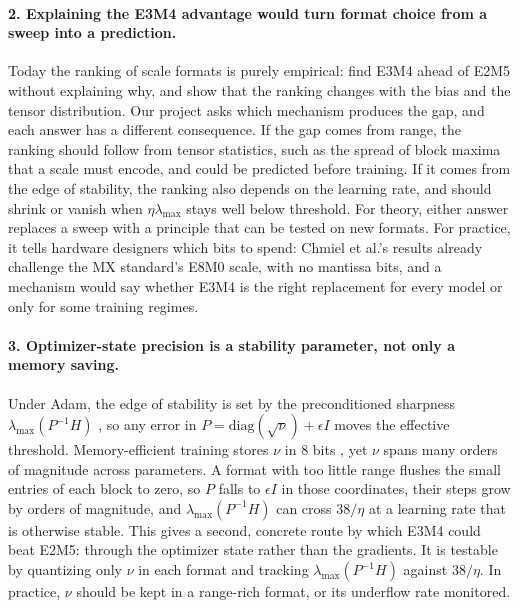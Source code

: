 \documentclass[11pt,letterpaper]{article}
\begin{document}
\paragraph{2. Explaining the E3M4 advantage would turn format choice from a sweep into a prediction.}
Today the ranking of scale formats is purely empirical: \citet{Chmiel2025} find E3M4 ahead of E2M5 without explaining why, and \citet{Kuzmin2022} show that the ranking changes with the bias and the tensor distribution. Our project asks which mechanism produces the gap, and each answer has a different consequence. If the gap comes from range, the ranking should follow from tensor statistics, such as the spread of block maxima that a scale must encode, and could be predicted before training. If it comes from the edge of stability, the ranking also depends on the learning rate, and should shrink or vanish when $\eta\lambda_{\max}$ stays well below threshold. For theory, either answer replaces a sweep with a principle that can be tested on new formats. For practice, it tells hardware designers which bits to spend: Chmiel et al.'s results already challenge the MX standard's E8M0 scale, with no mantissa bits, and a mechanism would say whether E3M4 is the right replacement for every model or only for some training regimes.

\paragraph{3. Optimizer-state precision is a stability parameter, not only a memory saving.}
Under Adam, the edge of stability is set by the preconditioned sharpness $\lambda_{\max}(P^{-1}H)$ \citep{Cohen2022}, so any error in $P=\mathrm{diag}(\sqrt{\nu})+\epsilon I$ moves the effective threshold. Memory-efficient training stores $\nu$ in 8 bits \citep{Dettmers2022b}, yet $\nu$ spans many orders of magnitude across parameters. A format with too little range flushes the small entries of each block to zero, so $P$ falls to $\epsilon I$ in those coordinates, their steps grow by orders of magnitude, and $\lambda_{\max}(P^{-1}H)$ can cross $38/\eta$ at a learning rate that is otherwise stable. This gives a second, concrete route by which E3M4 could beat E2M5: through the optimizer state rather than the gradients. It is testable by quantizing only $\nu$ in each format and tracking $\lambda_{\max}(P^{-1}H)$ against $38/\eta$. In practice, $\nu$ should be kept in a range-rich format, or its underflow rate monitored.
\end{document}
